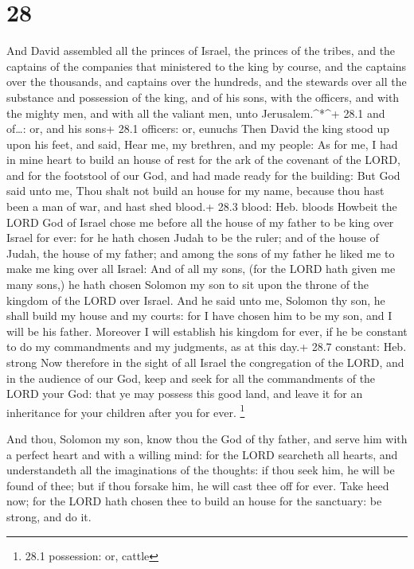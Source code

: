 \hypertarget{section-27}{%
\section{28}\label{section-27}}

 And David assembled all the princes of Israel, the princes
of the tribes, and the captains of the companies that ministered to the
king by course, and the captains over the thousands, and captains over
the hundreds, and the stewards over all the substance and possession of
the king, and of his sons, with the officers, and with the mighty men,
and with all the valiant men, unto Jerusalem.\^{}*\^{}+ 28.1 and
of\ldots: or, and his sons+ 28.1 officers: or, eunuchs  Then
David the king stood up upon his feet, and said, Hear me, my brethren,
and my people: As for me, I had in mine heart to build an house of rest
for the ark of the covenant of the LORD, and for the footstool of our
God, and had made ready for the building:  But God said unto
me, Thou shalt not build an house for my name, because thou hast been a
man of war, and hast shed blood.+ 28.3 blood: Heb. bloods 
Howbeit the LORD God of Israel chose me before all the house of my
father to be king over Israel for ever: for he hath chosen Judah to be
the ruler; and of the house of Judah, the house of my father; and among
the sons of my father he liked me to make me king over all Israel:
 And of all my sons, (for the LORD hath given me many sons,)
he hath chosen Solomon my son to sit upon the throne of the kingdom of
the LORD over Israel.  And he said unto me, Solomon thy son,
he shall build my house and my courts: for I have chosen him to be my
son, and I will be his father.  Moreover I will establish
his kingdom for ever, if he be constant to do my commandments and my
judgments, as at this day.+ 28.7 constant: Heb. strong  Now
therefore in the sight of all Israel the congregation of the LORD, and
in the audience of our God, keep and seek for all the commandments of
the LORD your God: that ye may possess this good land, and leave it for
an inheritance for your children after you for ever. \footnote{28.1
  possession: or, cattle}

 And thou, Solomon my son, know thou the God of thy father,
and serve him with a perfect heart and with a willing mind: for the LORD
searcheth all hearts, and understandeth all the imaginations of the
thoughts: if thou seek him, he will be found of thee; but if thou
forsake him, he will cast thee off for ever.  Take heed
now; for the LORD hath chosen thee to build an house for the sanctuary:
be strong, and do it.

